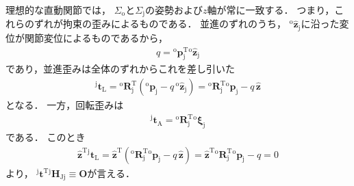 ﻿\documentclass[a4paper]{jsarticle}
\begin{document}
\vspace{\baselineskip}


理想的な直動関節では，
$\Sigma_{\mathrm{o}}$と$\Sigma_{\mathrm{j}}$の姿勢および$z$軸が常に一致する．
つまり，これらのずれが拘束の歪みによるものである．
並進のずれのうち，
${}^{\mathrm{o}}\hat{\bm{z}}_{\mathrm{j}}$に沿った変位が関節変位によるものであるから，
\begin{align*}
q={}^{\mathrm{o}}\bm{p}_{\mathrm{j}}^{\mathrm{T}}{}^{\mathrm{o}}\hat{\bm{z}}_{\mathrm{j}}
\end{align*}
であり，並進歪みは全体のずれからこれを差し引いた
\begin{align*}
{}^{\mathrm{j}}\bm{t}_{\mathrm{L}}
={}^{\mathrm{o}}\bm{R}_{\mathrm{j}}^{\mathrm{T}}({}^{\mathrm{o}}\bm{p}_{\mathrm{j}}-q\,{}^{\mathrm{o}}\hat{\bm{z}}_{\mathrm{j}})
={}^{\mathrm{o}}\bm{R}_{\mathrm{j}}^{\mathrm{T}}{}^{\mathrm{o}}\bm{p}_{\mathrm{j}}-q\,\hat{\bm{z}}
\end{align*}
となる．
一方，回転歪みは
\begin{align*}
{}^{\mathrm{j}}\bm{t}_{\mathrm{A}}={}^{\mathrm{o}}\bm{R}_{\mathrm{j}}^{\mathrm{T}}{}^{\mathrm{o}}\bm{\xi}_{\mathrm{j}}
\end{align*}
である．
このとき
\begin{align*}
\hat{\bm{z}}^{\mathrm{T}}{}^{\mathrm{j}}\bm{t}_{\mathrm{L}}
=\hat{\bm{z}}^{\mathrm{T}}({}^{\mathrm{o}}\bm{R}_{\mathrm{j}}^{\mathrm{T}}{}^{\mathrm{o}}\bm{p}_{\mathrm{j}}-q\,\hat{\bm{z}})
=\hat{\bm{z}}^{\mathrm{T}}{}^{\mathrm{o}}\bm{R}_{\mathrm{j}}^{\mathrm{T}}{}^{\mathrm{o}}\bm{p}_{\mathrm{j}}-q
=0
\end{align*}
より，
${}^{\mathrm{j}}\bm{t}^{\mathrm{T}}{}^{\mathrm{j}}\bm{H}_{\mathrm{Jj}}\equiv\bm{O}$が言える．



\vspace{\baselineskip}

\end{document}
